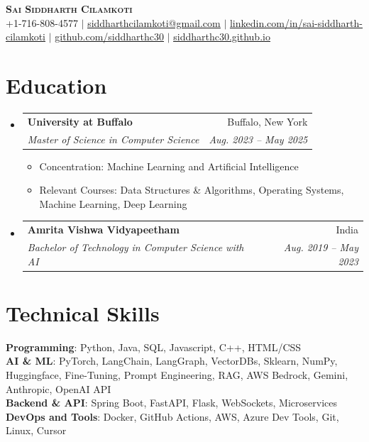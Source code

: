 \documentclass[letterpaper,11pt]{article}
\makeatletter
\newcommand{\resumeItem}[1]{
  \item\small{
    {#1 \vspace{-4pt}}
  }
}
\newcommand{\resumeSubheading}[4]{
  \vspace{-2pt}\item
    \begin{tabular*}{0.97\textwidth}[t]{l@{\extracolsep{\fill}}r}
      \textbf{#1} & #2 \\
      \textit{\small#3} & \textit{\small #4} \\
    \end{tabular*}\vspace{-10pt}
}
\newcommand{\resumeSubHeadingListStart}{\begin{itemize}[leftmargin=0.15in, label={}]}
\newcommand{\resumeSubHeadingListEnd}{\end{itemize}}
\newcommand{\resumeItemListStart}{\begin{itemize}}
\newcommand{\resumeItemListEnd}{\end{itemize}\vspace{-8pt}}
\makeatother
\begin{document}
\begin{center}
    \textbf{\Large \scshape Sai Siddharth Cilamkoti} \\ \vspace{1pt}
    \small +1-716-808-4577 $|$ \href{mailto:siddharthcilamkoti@gmail.com}{\underline{siddharthcilamkoti@gmail.com}} $|$ 
    \href{https://linkedin.com/in/sai-siddharth-cilamkoti/}{\underline{linkedin.com/in/sai-siddharth-cilamkoti}} $|$
    \href{https://github.com/siddharthc30}{\underline{github.com/siddharthc30}} $|$
    \href{https://siddharthc30.github.io/}{\underline{siddharthc30.github.io}}
\end{center}


\section{Education}
  \resumeSubHeadingListStart
    \resumeSubheading
      {University at Buffalo}{Buffalo, New York}
      {Master of Science in Computer Science}{Aug. 2023 -- May 2025}
      \resumeItemListStart
        \resumeItem{Concentration: Machine Learning and Artificial Intelligence}
        \resumeItem{Relevant Courses: Data Structures \& Algorithms, Operating Systems, Machine Learning, Deep Learning}
      \resumeItemListEnd
    \resumeSubheading
      {Amrita Vishwa Vidyapeetham}{India}
      {Bachelor of Technology in Computer Science with AI}{Aug. 2019 -- May 2023}
  \resumeSubHeadingListEnd

\section{Technical Skills}
 \begin{itemize}[leftmargin=0.15in, label={}]
    \small{\item{
     \textbf{Programming}{: Python, Java, SQL, Javascript, C++, HTML/CSS} \\
     \textbf{AI \& ML}{: PyTorch, LangChain, LangGraph, VectorDBs, Sklearn, NumPy, Huggingface, Fine-Tuning, Prompt Engineering, RAG, AWS Bedrock, Gemini, Anthropic, OpenAI API} \\
     \textbf{Backend \& API}{: Spring Boot, FastAPI, Flask, WebSockets, Microservices}  \\
    \textbf{DevOps and Tools}{: Docker, GitHub Actions, AWS, Azure Dev Tools, Git, Linux, Cursor}
    }}
 \end{itemize}
\end{document}
